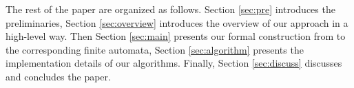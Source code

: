 The rest of the paper are organized as follows. Section \ref{sec:pre} introduces the preliminaries, Section \ref{sec:overview} introduces the overview of our approach in a high-level way. Then Section \ref{sec:main} presents our formal construction from \ltlf to the corresponding finite automata, Section \ref{sec:algorithm} presents the implementation details of our algorithms. Finally, Section \ref{sec:discuss} discusses and concludes the paper.  









